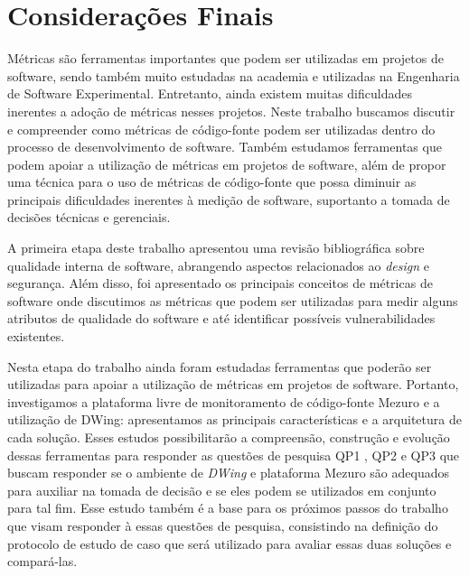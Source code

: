 \chapter{Considerações Finais}
\label{cap-consideracoesFinais}

Métricas são ferramentas importantes que podem ser utilizadas em projetos de software, sendo também muito estudadas na academia e utilizadas na Engenharia de Software Experimental. Entretanto, ainda existem muitas dificuldades inerentes a adoção de métricas nesses projetos. Neste trabalho buscamos discutir e compreender como métricas de código-fonte podem ser utilizadas dentro do processo de desenvolvimento de software. Também estudamos ferramentas que podem apoiar a utilização de métricas em projetos de software, além de propor uma técnica para o uso de métricas de código-fonte que possa diminuir as principais dificuldades inerentes à medição de software, suportanto a tomada de decisões técnicas e gerenciais.

%

A primeira etapa deste trabalho apresentou uma revisão bibliográfica sobre qualidade interna de software, abrangendo aspectos relacionados ao \emph{design} e segurança. Além disso, foi apresentado os principais conceitos de métricas de software onde discutimos as métricas que podem ser utilizadas para medir alguns atributos de qualidade do software e até identificar possíveis vulnerabilidades existentes.

%

Nesta etapa do trabalho ainda foram estudadas ferramentas que poderão ser utilizadas para apoiar a utilização de métricas em projetos de software. Portanto, investigamos a plataforma livre de monitoramento de código-fonte Mezuro e a utilização de DWing: apresentamos as principais características e a arquitetura de cada solução. Esses estudos possibilitarão a compreensão, construção e evolução dessas ferramentas para responder as questões de pesquisa QP1 , QP2 e QP3 que buscam responder se o ambiente de \emph{DWing} e plataforma Mezuro são adequados para auxiliar na tomada de decisão e se eles podem se utilizados em conjunto para tal fim. Esse estudo também é a base para os próximos passos do trabalho que visam responder à essas questões de pesquisa, consistindo na definição do protocolo de estudo de caso que será utilizado para avaliar essas duas soluções e compará-las.


